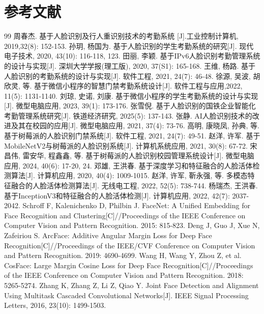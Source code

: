 \documentclass[UTF8]{heuthesis}
\begin{document}
\chapter*{参考文献}
\begin{thebibliography}{99}
 周春杰. 基于人脸识别及行人重识别技术的考勤系统 [J].工业控制计算机, 2019,32(8): 152-153.
 孙玥, 杨国为. 基于人脸识别的学生考勤系统的研究[J]. 现代电子技术, 2020, 43(10): 116-118, 123.
 田丽, 李颖. 基于IPv6人脸识别考勤管理系统的设计与实现[J]. 深圳大学学报(理工版), 2020, 37(S1): 165-168.
 王维, 杨路. 基于人脸识别的考勤系统的设计与实现[J]. 软件工程, 2021, 24(7): 46-48.
 徐源, 吴波, 胡欣灵, 等. 基于微信小程序的智慧门禁考勤系统设计[J]. 软件工程与应用,2022, 11(5): 1131-1140.
 刘琼, 史诺, 刘康. 基于微信小程序的学生考勤系统的设计与实现[J]. 微型电脑应用, 2023, 39(1): 173-176.
 张雪倪. 基于人脸识别的国铁企业智能化考勤管理系统研究[J]. 铁道经济研究, 2025(5): 137-143.
 张静. AI人脸识别技术的改进及其在校园的应用[J]. 微型电脑应用, 2021, 37(4): 73-76.
 高明, 康晓凤, 孙典, 等. 基于树莓派的人脸识别门禁系统[J]. 软件工程, 2021, 24(7): 49-51.
 赵洋, 许军. 基于MobileNetV2与树莓派的人脸识别系统[J]. 计算机系统应用, 2021, 30(8): 67-72.
 宋昌伟, 雷安华, 程鑫鑫, 等. 基于树莓派的人脸识别校园管理系统设计[J]. 微型电脑应用, 2024, 40(6): 17-20, 24.
 邓雄, 王洪春. 基于深度学习和特征融合的人脸活体检测算法[J]. 计算机应用, 2020, 40(4): 1009-1015.
 赵洋, 许军, 靳永强, 等. 多模态特征融合的人脸活体检测算法[J]. 无线电工程, 2022, 52(5): 738-744.
 杨瑞杰, 王洪春. 基于InceptionV3和特征融合的人脸活体检测[J]. 计算机应用, 2022, 42(7): 2037-2042.
 Schroff F, Kalenichenko D, Philbin J. FaceNet: A Unified Embedding for Face Recognition and Clustering[C]//Proceedings of the IEEE Conference on Computer Vision and Pattern Recognition. 2015: 815-823.
 Deng J, Guo J, Xue N, Zafeiriou S. ArcFace: Additive Angular Margin Loss for Deep Face Recognition[C]//Proceedings of the IEEE/CVF Conference on Computer Vision and Pattern Recognition. 2019: 4690-4699.
 Wang H, Wang Y, Zhou Z, et al. CosFace: Large Margin Cosine Loss for Deep Face Recognition[C]//Proceedings of the IEEE Conference on Computer Vision and Pattern Recognition. 2018: 5265-5274.
 Zhang K, Zhang Z, Li Z, Qiao Y. Joint Face Detection and Alignment Using Multitask Cascaded Convolutional Networks[J]. IEEE Signal Processing Letters, 2016, 23(10): 1499-1503.

\end{thebibliography}
\end{document}
